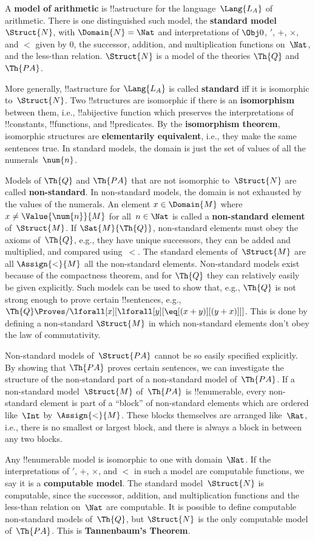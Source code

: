 A \textbf{model of arithmetic} is !!a{structure} for the
language~$\Lang{L_A}$ of arithmetic.  There is one distinguished such
model, the \textbf{standard model}~$\Struct{N}$, with $\Domain{N}
= \Nat$ and interpretations of $\Obj 0$, $\prime$, $+$, $\times$, and
$<$ given by $0$, the successor, addition, and multiplication
functions on~$\Nat$, and the less-than relation. $\Struct{N}$ is a
model of the theories $\Th{Q}$ and~$\Th{PA}$.

More generally, !!a{structure} for $\Lang{L_A}$ is
called \textbf{standard} iff it is isomorphic to~$\Struct{N}$. Two
!!{structure}s are isomorphic if there is an \textbf{isomorphism}
between them, i.e., !!a{bijective} function which preserves the
interpretations of !!{constant}s, !!{function}s, and !!{predicate}s.
By the \textbf{isomorphism theorem}, isomorphic structures
are \textbf{elementarily equivalent}, i.e., they make the same
sentences true.  In standard models, the domain is just the set of
values of all the numerals~$\num{n}$.

Models of $\Th{Q}$ and $\Th{PA}$ that are not isomorphic
to~$\Struct{N}$ are called \textbf{non-standard}. In non-standard
models, the domain is not exhausted by the values of the numerals.  An
element $x \in \Domain{M}$ where $x \neq \Value{\num{n}}{M}$ for
all~$n \in \Nat$ is called a \textbf{non-standard element}
of~$\Struct{M}$.  If $\Sat{M}{\Th{Q}}$, non-standard elements must
obey the axioms of~$\Th{Q}$, e.g., they have unique successors, they
can be added and multiplied, and compared using~$<$. The standard
elements of~$\Struct{M}$ are all $\Assign{<}{M}$ all the non-standard
elements.  Non-standard models exist because of the compactness
theorem, and for $\Th{Q}$ they can relatively easily be given
explicitly. Such models can be used to show that, e.g., $\Th{Q}$ is
not strong enough to prove certain !!{sentence}s, e.g.,
$\Th{Q} \Proves/ \lforall[x][\lforall[y][\eq[(x+y)][(y+x)]]]$. This is
done by defining a non-standard $\Struct{M}$ in which non-standard
elements don't obey the law of commutativity.

Non-standard models of~$\Struct{PA}$ cannot be so easily specified
explicitly. By showing that $\Th{PA}$ proves certain sentences, we can
investigate the structure of the non-standard part of a non-standard
model of~$\Th{PA}$. If a non-standard model~$\Struct{M}$ of~$\Th{PA}$
is !!{enumerable}, every non-standard element is part of a ``block''
of non-standard elements which are ordered like~$\Int$
by~$\Assign{<}{M}$.  These blocks themselves are arranged like~$\Rat$,
i.e., there is no smallest or largest block, and there is always a
block in between any two blocks.

Any !!{enumerable} model is isomorphic to one with domain~$\Nat$. If
the interpretations of $\prime$, $+$, $\times$, and $<$ in such a
model are computable functions, we say it is a \textbf{computable
model}. The standard model~$\Struct{N}$ is computable, since the
successor, addition, and multiplication functions and the less-than
relation on~$\Nat$ are computable. It is possible to define computable
non-standard models of~$\Th{Q}$, but $\Struct{N}$ is the only
computable model of~$\Th{PA}$. This is \textbf{Tannenbaum's Theorem}.

